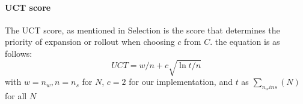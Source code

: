 \documentclass[../report.tex]{subfiles}
\begin{document}
\paragraph{UCT score}
The UCT score, as mentioned in Selection is the score that determines the priority of expansion or rollout when choosing $c$ from $C$. the equation is as follows:
\begin{equation}\label{eq:uct}
    UCT=w/n + c \sqrt{\ln{t}/n}
\end{equation}
with $w = n_w, n = n_s$ for $N$, $c = 2$ for our implementation, and $t$ as $\sum_{n_wins}(N)$ for all $N$
\end{document}
